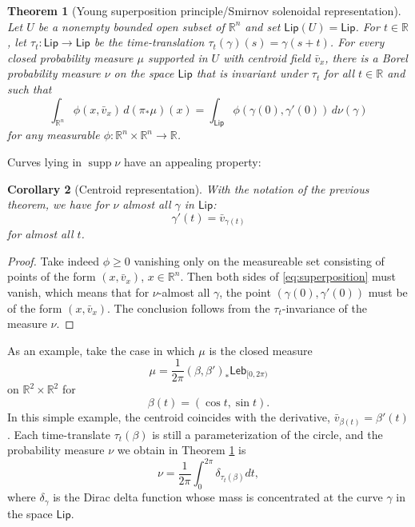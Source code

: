\documentclass[11pt]{article}
\newtheorem{thm}{Theorem}
\newtheorem{coro}[thm]{Corollary}
\theoremstyle{definition}
\theoremstyle{remark}
\DeclareMathOperator{\supp}{supp}
\newcommand{\R}{\mathbb{R}}
\newcommand{\lebesgue}{\mathsf{Leb}}
\newcommand{\lipschitz}{\mathsf{Lip}}
\renewcommand{\geq}{\geqslant}
\begin{document}
\begin{thm}[Young superposition principle/Smirnov solenoidal representation]\label{thm:superposition}
 Let $U$ be a non\-emp\-ty bounded open subset of $\R^n$ and set $\lipschitz(U)=\lipschitz$. 
 For $t\in\R$, let $\tau_t\colon\lipschitz\to\lipschitz$ be the time-translation $\tau_t(\gamma)(s)=\gamma(s+t)$.
 For every closed probability measure $\mu$ supported in $U$ with centroid field $\bar v_x$, there is a Borel probability measure $\nu$ on the space $\lipschitz$ that is invariant under $\tau_t$ for all $t\in \R$ and such that
 \begin{equation}\label{eq:superposition}
  \int_{\R^n} \phi(x,\bar v_x)\,d(\pi_*\mu)(x)=\int_\lipschitz \phi(\gamma(0),\gamma'(0))\,d\nu(\gamma) 
 \end{equation}
 for any measurable $\phi\colon\R^n\times\R^n\to\R$.
\end{thm}
\noindent 
Curves lying in $\supp \nu$ have an appealing property:
\begin{coro}[Centroid representation]\label{cor:superpositionvx}
With the notation of the previous theorem, we have for $\nu$ almost all $\gamma$ in $\lipschitz$:
$$ \gamma'(t)=\bar v_{\gamma(t)}$$
for almost all $t$.
\end{coro}
\begin{proof}  Take indeed $\phi\geq 0$ vanishing only on the measureable set consisting of points of the form $(x,\bar v_{x})$, $x\in\R^n$. Then both sides of \eqref{eq:superposition} must vanish, which means that for $\nu$-almost all $\gamma$, the point $(\gamma(0),\gamma'(0))$ must be of the form $(x,\bar v_{x})$. The conclusion follows from the $\tau_t$-invariance of the measure $\nu$.
\end{proof}

As an example, take the case in which $\mu$ is the closed measure \[\mu=\frac1{2\pi}(\beta,\beta')_*\lebesgue_{[0,2\pi)}\] 
on $\R^2\times\R^2$ for
\[\beta(t)=(\cos t,\sin t).\]
In this simple example, the centroid coincides with the derivative, $\bar v_{\beta(t)}=\beta'(t)$.
Each time-translate $\tau_t(\beta)$ is still a parameterization of the circle, and the probability measure $\nu$ we obtain in Theorem \ref{thm:superposition} is 
\[\nu=\frac1{2\pi}\int_0^{2\pi} \delta_{\tau_t(\beta)}dt,\]
where $\delta_\gamma$ is the Dirac delta function whose mass is concentrated at the curve $\gamma$ in the space $\lipschitz$.
\end{document}
